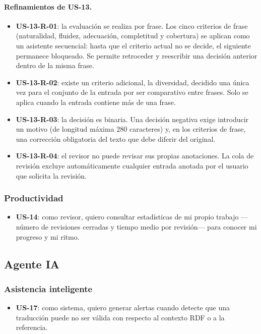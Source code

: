 \paragraph{Refinamientos de US-13.}
\begin{itemize}
	\item \textbf{US-13-R-01}: la evaluación se realiza por frase. Los cinco criterios de
	      frase (naturalidad, fluidez, adecuación, completitud y cobertura) se aplican
	      como un asistente secuencial: hasta que el criterio actual no se decide, el
	      siguiente permanece bloqueado. Se permite retroceder y reescribir una decisión
	      anterior dentro de la misma frase.
	\item \textbf{US-13-R-02}: existe un criterio adicional, la diversidad, decidido una
	      única vez para el conjunto de la entrada por ser comparativo entre frases. Solo
	      se aplica cuando la entrada contiene más de una frase.
	\item \textbf{US-13-R-03}: la decisión es binaria. Una decisión negativa exige
	      introducir un motivo (de longitud máxima 280 caracteres) y, en los criterios de
	      frase, una corrección obligatoria del texto que debe diferir del original.
	\item \textbf{US-13-R-04}: el revisor no puede revisar sus propias anotaciones. La
	      cola de revisión excluye automáticamente cualquier entrada anotada por el
	      usuario que solicita la revisión.
\end{itemize}

\subsubsection{Productividad}
\begin{itemize}
	\item \textbf{US-14}: como revisor, quiero consultar estadísticas de mi propio
	      trabajo ---número de revisiones cerradas y tiempo medio por revisión--- para
	      conocer mi progreso y mi ritmo.
\end{itemize}

\subsection{Agente IA}

\subsubsection{Asistencia inteligente}
\begin{itemize}
	\item \textbf{US-17}: como sistema, quiero generar alertas cuando detecte que una
	      traducción puede no ser válida con respecto al contexto RDF o a la referencia.
\end{itemize}


